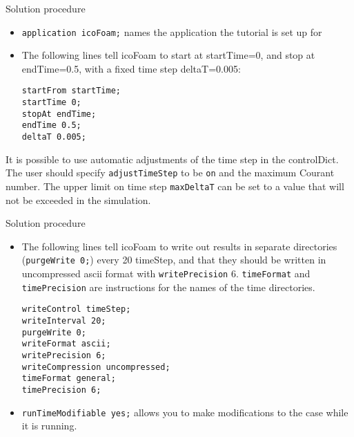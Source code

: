 \documentclass{beamer}
\begin{document}
\begin{frame}[fragile]{Solution procedure}

\begin{itemize}
\item \texttt{application icoFoam;} names the application the tutorial is set up for
\item The following lines tell icoFoam to start at startTime=0, and stop at
endTime=0.5, with a fixed time step deltaT=0.005:
\begin{small}
\begin{verbatim}
startFrom startTime;
startTime 0;
stopAt endTime;
endTime 0.5;
deltaT 0.005;
\end{verbatim}
\end{small}
\end{itemize}

\begin{block}

It is possible to use automatic adjustments of the time step in the controlDict. The user should specify \texttt{adjustTimeStep} to be \texttt{on} and the maximum Courant number. The upper limit on time step \texttt{maxDeltaT} can be set to a value that will not be exceeded in the simulation. 

\end{block}

\end{frame}

\begin{frame}[fragile]{Solution procedure}

\begin{itemize}
\item The following lines tell icoFoam to write out results in separate directories
(\texttt{purgeWrite 0;}) every 20 timeStep, and that they should be written in
uncompressed ascii format with \texttt{writePrecision} 6. \texttt{timeFormat} and
\texttt{timePrecision} are instructions for the names of the time directories.
\begin{small}
\begin{verbatim}
writeControl timeStep;
writeInterval 20;
purgeWrite 0;
writeFormat ascii;
writePrecision 6;
writeCompression uncompressed;
timeFormat general;
timePrecision 6;
\end{verbatim}
\end{small}
\item \texttt{runTimeModifiable yes;} allows you to make modifications to the case while
it is running.
\end{itemize}

\end{frame}
\end{document}
